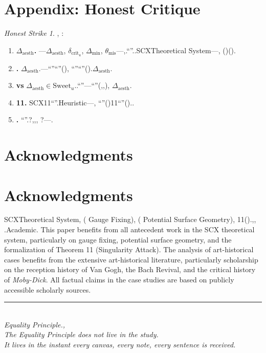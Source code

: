 \documentclass[12pt,a4paper]{article}
\theoremstyle{remark}
\newtheorem{honestattack}{Honest Strike}
\newcommand{\AesthDelta}{\Delta_{\text{aesth}}}
\newcommand{\CritDelta}{\delta_{\text{crit}}}
\begin{document}
\section*{Appendix: Honest Critique}
\begin{honestattack}
, : 
\begin{enumerate}
 \item \textbf{$\AesthDelta$.} ---$\AesthDelta$, $\CritDelta_u$, $\Delta_{\text{min}}$, $\theta_{\text{mis}}$---,.``''..SCXTheoretical System---, ()().
 \item \textbf{.} $\AesthDelta$.---``''``''(), ``''``''().$\AesthDelta$.
 \item \textbf{ vs} $\AesthDelta \in \text{Sweet}_u$..``''---``''(,,), $\AesthDelta$.
 \item \textbf{11.} SCX11``''.Heuristic---, ``''()11``''()..
 \item \textbf{.} ``''.?,,, ?---.
\end{enumerate}
\end{honestattack}
\section*{Acknowledgments}
\section*{Acknowledgments}
SCXTheoretical System, ({\kaishu} Gauge Fixing), ({\kaishu} Potential Surface Geometry), 11().,, {\kaishu}.Academic.
This paper benefits from all antecedent work in the SCX theoretical system, particularly on gauge fixing, potential surface geometry, and the formalization of Theorem 11 (Singularity Attack). The analysis of art-historical cases benefits from the extensive art-historical literature, particularly scholarship on the reception history of Van Gogh, the Bach Revival, and the critical history of \textit{Moby-Dick}. All factual claims in the case studies are based on publicly accessible scholarly sources.
\vspace{12pt}
\begin{center}
\rule{0.3\textwidth}{0.4pt}\\[6pt]
\textit{Equality Principle.,}\\[4pt]
\textit{The Equality Principle does not live in the study.}\\
\textit{It lives in the instant every canvas, every note, every sentence is received.}
\end{center}
\end{document}
